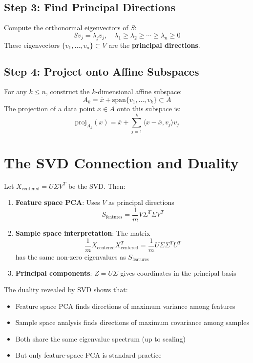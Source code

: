 \begin{notechapter}
\subsection{Step 3: Find Principal Directions}
Compute the orthonormal eigenvectors of $S$:
\[
S v_j = \lambda_j v_j, \quad \lambda_1 \geq \lambda_2 \geq \cdots \geq \lambda_n \geq 0
\]
These eigenvectors $\{v_1, \dots, v_n\} \subset V$ are the \textbf{principal directions}.

\subsection{Step 4: Project onto Affine Subspaces}
For any $k \leq n$, construct the $k$-dimensional affine subspace:
\[
A_k = \bar{x} + \text{span}\{v_1, \dots, v_k\} \subset A
\]
The projection of a data point $x \in A$ onto this subspace is:
\[
\text{proj}_{A_k}(x) = \bar{x} + \sum_{j=1}^k \langle x - \bar{x}, v_j \rangle v_j
\]

\section{The SVD Connection and Duality}

\begin{theorem}
Let $X_{\text{centered}} = U \Sigma V^T$ be the SVD. Then:

\begin{enumerate}
    \item \textbf{Feature space PCA}: Uses $V$ as principal directions
    \[
    S_{\text{features}} = \frac{1}{m}V \Sigma^T \Sigma V^T
    \]
    
    \item \textbf{Sample space interpretation}: The matrix
    \[
    \frac{1}{m}X_{\text{centered}} X_{\text{centered}}^T = \frac{1}{m}U \Sigma \Sigma^T U^T
    \]
    has the same non-zero eigenvalues as $S_{\text{features}}$
    
    \item \textbf{Principal components}: $Z = U \Sigma$ gives coordinates in the principal basis
\end{enumerate}
\end{theorem}

\begin{remark}
The duality revealed by SVD shows that:
\begin{itemize}
    \item Feature space PCA finds directions of maximum variance among features
    \item Sample space analysis finds directions of maximum covariance among samples
    \item Both share the same eigenvalue spectrum (up to scaling)
    \item But only feature-space PCA is standard practice
\end{itemize}
\end{remark}


\end{notechapter}
